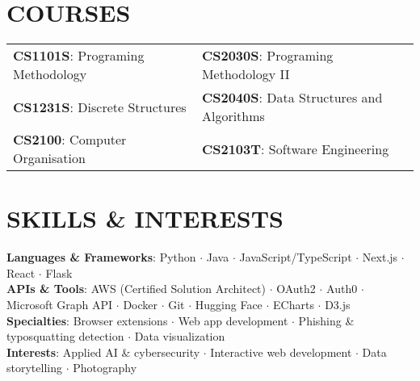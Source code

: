 \documentclass[letterpaper,11pt]{article}
\begin{document}
\section{COURSES}
\begin{tabularx}{\textwidth}{X X}
  \textbf{CS1101S}: Programing Methodology & \textbf{CS2030S}: Programing Methodology II \\
  \textbf{CS1231S}: Discrete Structures & \textbf{CS2040S}: Data Structures and Algorithms \\
  \textbf{CS2100}: Computer Organisation & \textbf{CS2103T}: Software Engineering \\
\end{tabularx}

\section{SKILLS \& INTERESTS}
 \begin{itemize}[leftmargin=0.15in, label={}]
    \small{\item{
    \vspace{1mm}
    \textbf{Languages \& Frameworks}{: Python {\bfseries\large$\cdot$} Java {\bfseries\large$\cdot$} JavaScript/TypeScript {\bfseries\large$\cdot$} Next.js {\bfseries\large$\cdot$} React {\bfseries\large$\cdot$} Flask} \\
    \vspace{1mm}
    \textbf{APIs \& Tools}{: AWS (Certified Solution Architect) {\bfseries\large$\cdot$} OAuth2 {\bfseries\large$\cdot$} Auth0 {\bfseries\large$\cdot$} Microsoft Graph API {\bfseries\large$\cdot$} Docker {\bfseries\large$\cdot$} Git {\bfseries\large$\cdot$} Hugging Face {\bfseries\large$\cdot$} ECharts {\bfseries\large$\cdot$} D3.js} \\
    \vspace{1mm}
    \textbf{Specialties}{: Browser extensions {\bfseries\large$\cdot$} Web app development {\bfseries\large$\cdot$} Phishing \& typosquatting detection {\bfseries\large$\cdot$} Data visualization} \\
    \vspace{1mm}
    \textbf{Interests}{: Applied AI \& cybersecurity {\bfseries\large$\cdot$} Interactive web development {\bfseries\large$\cdot$} Data storytelling {\bfseries\large$\cdot$} Photography} \\
    }}
 \end{itemize}
 \begin{center}
\end{center}
\end{document}
